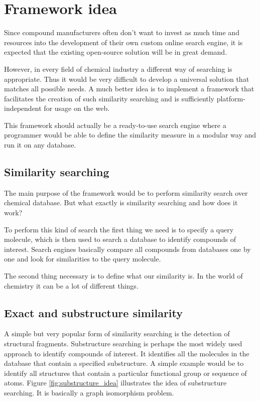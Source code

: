 \documentclass[thesis=M,english]{FITthesis}[2012/10/20]
\begin{document}
\section{Framework idea}
Since compound manufacturers often don’t want to invest as much time and resources into the development of their own custom online search engine, it is expected that the existing open-source solution will be in great demand.

However, in every field of chemical industry a different way of searching is appropriate. Thus it would be very difficult to develop a universal solution that matches all possible needs. A much better idea is to implement a framework that facilitates the creation of such similarity searching and is sufficiently platform-independent for usage on the web. 

This framework should actually be a ready-to-use search engine where a programmer would be able to define the similarity measure in a modular way and run it on any database.

\subsection{Similarity searching}
The main purpose of the framework would be to perform similarity search over chemical database. But what exactly is similarity searching and how does it work?

To perform this kind of search the first thing we need is to specify a query molecule, which is then used to search a database to identify compounds of interest. Search engines basically compare all compounds from databases one by one and look for similarities to the query molecule. 

The second thing necessary is to define what our similarity is. In the world of chemistry it can be a lot of different things. 

\subsection{Exact and substructure similarity}
A simple but very popular form of similarity searching is the detection of structural fragments. Substructure searching is perhaps the most widely used approach to identify compounds of interest. It identifies all the molecules in the database that contain a specified substructure. A simple example would be to identify all structures that contain a particular functional group or sequence of atoms. Figure \ref{fig:substructure_idea} illustrates the idea of substructure searching. It is basically a graph isomorphism problem.
\end{document}
